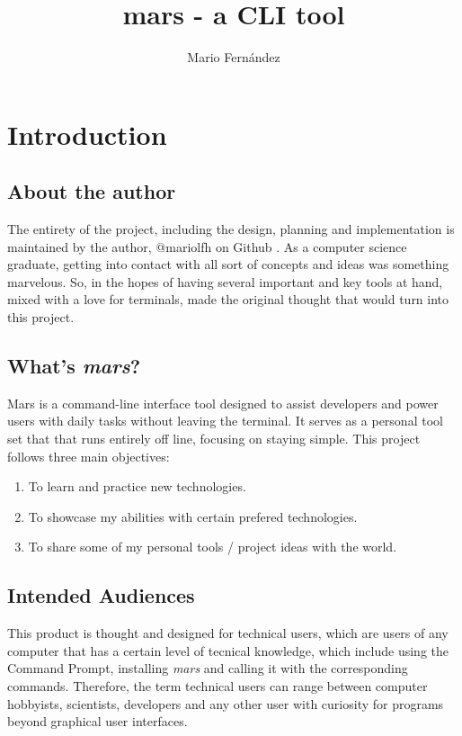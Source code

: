 \documentclass{report}
\title{mars - a CLI tool}
\author{Mario Fernández}
\begin{document}
\maketitle

\tableofcontents

\chapter{Introduction}
\section{About the author}
The entirety of the project, including the design, planning and implementation is maintained by the author, @mariolfh on Github \cite{githubinc.MariolfhOverview2025}. As a computer science graduate, getting into contact with all sort of concepts and ideas was something marvelous. So, in the hopes of having several important and key tools at hand, mixed with a love for terminals, made the original thought that would turn into this project. 

\section{What's \emph{mars}?}
Mars is a command-line interface tool designed to assist developers and power users with daily tasks without leaving the terminal. It serves as a personal tool set that that runs entirely off line, focusing on staying simple.
This project follows three main objectives:
\begin{enumerate}
\item{To learn and practice new technologies.}
\item{To showcase my abilities with certain prefered technologies.}
\item{To share some of my personal tools / project ideas with the world.}
\end{enumerate}

\section{Intended Audiences}
This product is thought and designed for technical users, which are users of any computer that has a certain level of tecnical knowledge, which include using the Command Prompt, installing \emph{mars} and calling it with the corresponding commands. Therefore, the term technical users can range between computer hobbyists, scientists, developers and any other user with curiosity for programs beyond graphical user interfaces.
\end{document}
